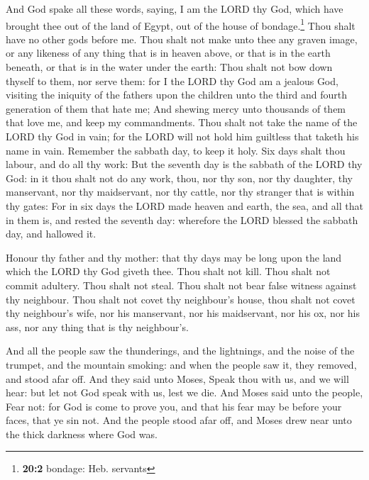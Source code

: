  And God spake all these words, saying,  I
am the LORD thy God, which have brought thee out of the land of Egypt,
out of the house of bondage.\footnote{\textbf{20:2} bondage: Heb.
  servants}  Thou shalt have no other gods before me.
 Thou shalt not make unto thee any graven image, or any
likeness of any thing that is in heaven above, or that is in the earth
beneath, or that is in the water under the earth:  Thou
shalt not bow down thyself to them, nor serve them: for I the LORD thy
God am a jealous God, visiting the iniquity of the fathers upon the
children unto the third and fourth generation of them that hate me;
 And shewing mercy unto thousands of them that love me,
and keep my commandments.  Thou shalt not take the name of
the LORD thy God in vain; for the LORD will not hold him guiltless that
taketh his name in vain.  Remember the sabbath day, to
keep it holy.  Six days shalt thou labour, and do all thy
work:  But the seventh day is the sabbath of the LORD thy
God: in it thou shalt not do any work, thou, nor thy son, nor thy
daughter, thy manservant, nor thy maidservant, nor thy cattle, nor thy
stranger that is within thy gates:  For in six days the
LORD made heaven and earth, the sea, and all that in them is, and rested
the seventh day: wherefore the LORD blessed the sabbath day, and
hallowed it.

 Honour thy father and thy mother: that thy days may be
long upon the land which the LORD thy God giveth thee. 
Thou shalt not kill.  Thou shalt not commit adultery.
 Thou shalt not steal.  Thou shalt not
bear false witness against thy neighbour.  Thou shalt not
covet thy neighbour's house, thou shalt not covet thy neighbour's wife,
nor his manservant, nor his maidservant, nor his ox, nor his ass, nor
any thing that is thy neighbour's.

 And all the people saw the thunderings, and the
lightnings, and the noise of the trumpet, and the mountain smoking: and
when the people saw it, they removed, and stood afar off.
 And they said unto Moses, Speak thou with us, and we
will hear: but let not God speak with us, lest we die. 
And Moses said unto the people, Fear not: for God is come to prove you,
and that his fear may be before your faces, that ye sin not.
 And the people stood afar off, and Moses drew near unto
the thick darkness where God was.

